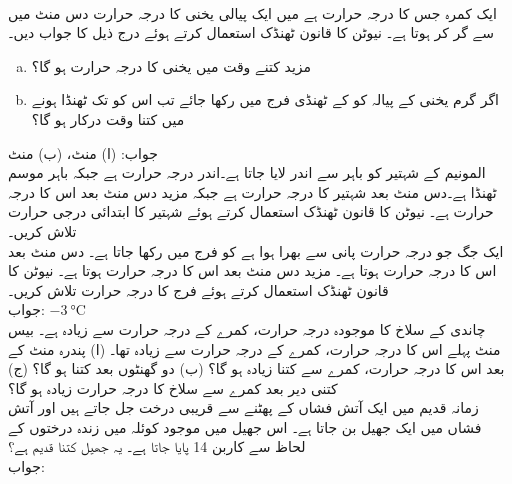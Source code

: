 \\
ایک کمرہ جس کا درجہ حرارت  ہے میں ایک پیالی یخنی کا درجہ حرارت دس منٹ میں  سے گر کر  ہوتا ہے۔ نیوٹن کا قانون ٹھنڈک استعمال کرتے ہوئے درج ذیل کا جواب دیں۔
\begin{enumerate}[a.]
\item
مزید کتنے وقت میں یخنی کا درجہ حرارت ہو گا؟
\item
اگر  گرم یخنی کے پیالہ کو  کے ٹھنڈی فرج میں رکھا جائے تب اس کو  تک ٹھنڈا ہونے میں کتنا وقت درکار ہو گا؟ 
\end{enumerate} 
جواب:\quad
(ا) منٹ، (ب)  منٹ
\\
المونیم کے  شہتیر کو باہر سے اندر لایا جاتا ہے۔اندر  درجہ حرارت  ہے جبکہ  باہر موسم ٹھنڈا ہے۔دس منٹ بعد شہتیر کا درجہ حرارت  ہے جبکہ مزید دس منٹ بعد اس کا درجہ حرارت  ہے۔ نیوٹن کا قانون ٹھنڈک استعمال کرتے ہوئے شہتیر کا ابتدائی درجی حرارت تلاش کریں۔
\\
ایک جگ جو  درجہ حرارت پانی سے بھرا ہوا ہے کو فرج میں رکھا جاتا ہے۔ دس منٹ بعد اس کا درجہ حرارت  ہوتا ہے۔ مزید دس منٹ بعد اس کا درجہ حرارت  ہوتا ہے۔ نیوٹن کا قانون ٹھنڈک استعمال کرتے ہوئے فرج کا درجہ حرارت تلاش کریں۔\\
جواب:\quad
$\SI{-3}{\celsius}$
\\
چاندی کے سلاخ کا موجودہ درجہ حرارت، کمرے کے درجہ حرارت سے  زیادہ ہے۔ بیس منٹ پہلے اس کا درجہ حرارت، کمرے کے درجہ حرارت سے  زیادہ تھا۔ (ا) پندرہ منٹ کے بعد اس کا درجہ حرارت، کمرے سے کتنا زیادہ ہو گا؟ (ب) دو گھنٹوں بعد کتنا ہو گا؟ (ج) کتنی دیر بعد کمرے سے سلاخ کا درجہ حرارت  زیادہ ہو گا؟  
\\
زمانہ قدیم میں ایک آتش فشاں کے پھٹنے سے قریبی درخت جل جاتے ہیں اور آتش فشاں میں ایک جھیل بن جاتا ہے۔ اس جھیل میں موجود کوئلہ میں زندہ درختوں کے لحاظ سے   کاربن 14 پایا جاتا ہے۔ یہ جھیل کتنا قدیم ہے؟\\
جواب:\quad
